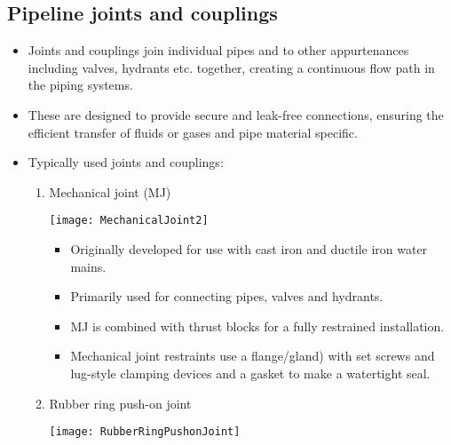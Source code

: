 \subsection{Pipeline joints and couplings}  
\begin{itemize}
\item Joints and couplings join individual pipes and to other appurtenances including valves, hydrants etc. together, creating a continuous flow path in the piping systems. 
\item These are designed to provide secure and leak-free connections, ensuring the efficient transfer of fluids or gases and pipe material specific.
\item Typically used joints and couplings:
\begin{enumerate}
\item Mechanical joint (MJ) \\
\begin{minipage}{0.3\textwidth}
\texttt{[image: MechanicalJoint2]}
\end{minipage}
\begin{minipage}{0.1\textwidth}
\end{minipage}
\begin{minipage}{0.55\textwidth}
\begin{itemize}
\item Originally developed for use with cast iron and ductile iron water mains.
\item Primarily used for connecting pipes, valves and hydrants.
\item MJ is combined with thrust blocks for a fully restrained installation.
\item Mechanical joint restraints use a flange/gland) with set screws and lug-style clamping devices and a gasket to make a watertight seal.
\end{itemize}
\end{minipage}
\vspace{0.3cm}
\item Rubber ring push-on joint \\
\begin{minipage}{0.3\textwidth}
\texttt{[image: RubberRingPushonJoint]}
\end{minipage}
\begin{minipage}{0.1\textwidth}
\end{minipage}
\begin{minipage}{0.55\textwidth}

\end{minipage}
\end{enumerate}
\end{itemize}
